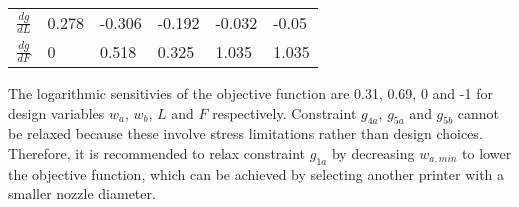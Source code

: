 \begin{table}
\begin{tabular}{c|lllll}
		\textbf{$\frac{d g}{d L}$}   & 0.278                                                   & \cellcolor[HTML]{9AFF99}-0.306                        & -0.192                                                & \cellcolor[HTML]{9AFF99}-0.032                        & \cellcolor[HTML]{9AFF99}-0.05                         \\ 
		\textbf{$\frac{dg}{d F}$}    & 0                                                       & \cellcolor[HTML]{9AFF99}0.518                         & 0.325                                                 & \cellcolor[HTML]{9AFF99}1.035                         & \cellcolor[HTML]{9AFF99}1.035                         \\ 
	\end{tabular}
\end{table}


The logarithmic sensitivies of the objective function are 0.31, 0.69, 0 and -1 for design variables $w_a$, $w_b$, $L$ and $F$ respectively. 
Constraint $g_{4a}$, $g_{5a}$ and $g_{5b}$ cannot be relaxed because these involve stress limitations rather than design choices. 
Therefore, it is recommended to relax constraint $g_{1a}$ by decreasing $w_{a,min}$ to lower the objective function, 
which can be achieved by selecting another printer with a smaller nozzle diameter.




